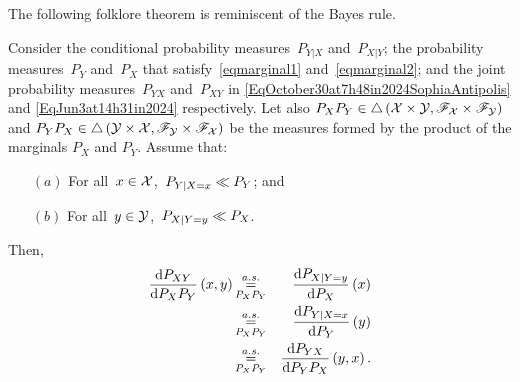 \documentclass[lettersize,onecolumn]{IEEEtran}
\begin{document}
 The following folklore theorem is reminiscent of the Bayes rule.

\begin{theorem}\label{TheoBYR}
Consider the conditional probability measures~$P_{Y | X}$ and~$P_{X | Y}$; the probability measures~$P_{Y}$ 
and~$P_{X}$ that satisfy~\eqref{eqmarginal1} and~\eqref{eqmarginal2}; and the joint probability measures~$P_{YX}$ and~$P_{XY}$ in \eqref{EqOctober30at7h48in2024SophiaAntipolis} and \eqref{EqJun3at14h31in2024} respectively. 
%
Let also $P_{X}P_{Y} \in \triangle\left( \mathcal X \times \mathcal Y , \mathscr{F}_{\mathcal X} \times \mathscr{F}_{\mathcal Y}\right)$ and $P_{Y}P_{X} \in \triangle\left( \mathcal Y \times \mathcal X , \mathscr{F}_{\mathcal Y} \times \mathscr{F}_{\mathcal X}\right)$ be the measures formed by the product of the marginals $P_{X}$ and $P_{Y}$. 
%
 Assume that:
\begin{itemize}
\item[$\left(a\right)$] For all~$x \in \mathcal X$,~${P_{Y | X = x}}\ll{P_{Y}}$; 
and 
\item[$\left(b\right)$] For all~$y \in \mathcal Y$,~${P_{X | Y = y}}\ll{P_{X}}$.
\end{itemize}
Then,
\begin{eqnarray}
\label{EqOuter1Inner1}
\frac{\mathrm{d} P_{XY}}{\mathrm{d} P_{X}P_{Y}} \left( x,y \right) &\displaystyle\mathop{ \stackrel{a.s.}{=}}_{P_XP_Y}& \frac{\mathrm{d} P_{X | Y = y}}{\mathrm{d} P_{X}} \left( x \right)\\
 \label{EqInner1Inner2}
 & \displaystyle\mathop{ \stackrel{a.s.}{=}}_{P_XP_Y} & \frac{\mathrm{d} P_{Y | X = x}}{\mathrm{d} P_{Y}}\left( y \right)\\
 \label{EqInner2Outer2}
 & \displaystyle\mathop{ \stackrel{a.s.}{=}}_{P_XP_Y} & \frac{\mathrm{d} P_{YX}}{\mathrm{d} P_{Y}P_{X}}\left( y,x\right).
\end{eqnarray}
\end{theorem}
%
\end{document}

